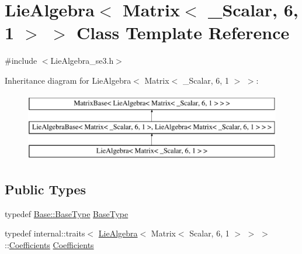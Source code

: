 \hypertarget{class_lie_algebra_3_01_matrix_3_01___scalar_00_016_00_011_01_4_01_4}{}\section{Lie\+Algebra$<$ Matrix$<$ \+\_\+\+Scalar, 6, 1 $>$ $>$ Class Template Reference}
\label{class_lie_algebra_3_01_matrix_3_01___scalar_00_016_00_011_01_4_01_4}


{\ttfamily \#include $<$Lie\+Algebra\+\_\+se3.\+h$>$}

Inheritance diagram for Lie\+Algebra$<$ Matrix$<$ \+\_\+\+Scalar, 6, 1 $>$ $>$\+:\begin{figure}[H]
\begin{center}
\leavevmode
\includegraphics[height=3.000000cm]{class_lie_algebra_3_01_matrix_3_01___scalar_00_016_00_011_01_4_01_4}
\end{center}
\end{figure}
\subsection*{Public Types}
\begin{DoxyCompactItemize}
\item 
typedef \hyperlink{class_lie_algebra_base_ae7884e2973ffa35f8b209b2831a066a1}{Base\+::\+Base\+Type} \hyperlink{class_lie_algebra_3_01_matrix_3_01___scalar_00_016_00_011_01_4_01_4_aa86c8317cea5955c8ba9d0871791ea23}{Base\+Type}
\item 
typedef internal\+::traits$<$ \hyperlink{class_lie_algebra}{Lie\+Algebra}$<$ Matrix$<$ Scalar, 6, 1 $>$ $>$ $>$\+::\hyperlink{class_lie_algebra_3_01_matrix_3_01___scalar_00_016_00_011_01_4_01_4_a2eb9bb9a54a2c7ce0b75b46814ea390e}{Coefficients} \hyperlink{class_lie_algebra_3_01_matrix_3_01___scalar_00_016_00_011_01_4_01_4_a2eb9bb9a54a2c7ce0b75b46814ea390e}{Coefficients}
\end{DoxyCompactItemize}
